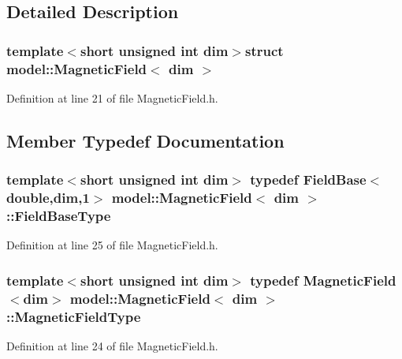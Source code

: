 \subsection{Detailed Description}
\subsubsection*{template$<$short unsigned int dim$>$struct model\+::\+Magnetic\+Field$<$ dim $>$}



Definition at line 21 of file Magnetic\+Field.\+h.



\subsection{Member Typedef Documentation}
\hypertarget{structmodel_1_1_magnetic_field_a641ae50a036729cdae6471a3a7b91219}{}
\subsubsection[{Field\+Base\+Type}]{\setlength{\rightskip}{0pt plus 5cm}template$<$short unsigned int dim$>$ typedef {\bf Field\+Base}$<$double,{\bf dim},1$>$ {\bf model\+::\+Magnetic\+Field}$<$ {\bf dim} $>$\+::{\bf Field\+Base\+Type}}\label{structmodel_1_1_magnetic_field_a641ae50a036729cdae6471a3a7b91219}


Definition at line 25 of file Magnetic\+Field.\+h.

\hypertarget{structmodel_1_1_magnetic_field_a1cd3f6036181c21543770f22c8218434}{}
\subsubsection[{Magnetic\+Field\+Type}]{\setlength{\rightskip}{0pt plus 5cm}template$<$short unsigned int dim$>$ typedef {\bf Magnetic\+Field}$<${\bf dim}$>$ {\bf model\+::\+Magnetic\+Field}$<$ {\bf dim} $>$\+::{\bf Magnetic\+Field\+Type}}\label{structmodel_1_1_magnetic_field_a1cd3f6036181c21543770f22c8218434}


Definition at line 24 of file Magnetic\+Field.\+h.

